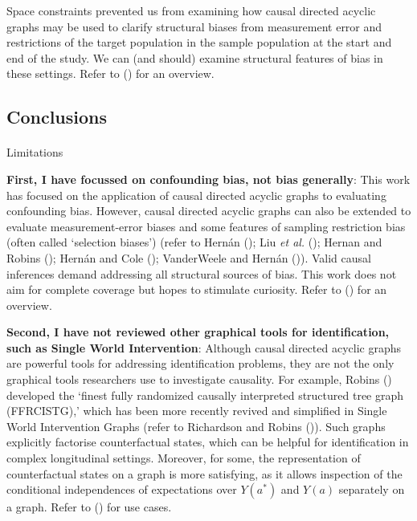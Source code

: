 \documentclass[
  single column]{article}
\makeatletter
\let\oldparagraph\paragraph
\renewcommand{\paragraph}{
    \@ifstar
      \xxxParagraphStar
      \xxxParagraphNoStar
  }
\newcommand{\xxxParagraphStar}[1]{\oldparagraph*{#1}\mbox{}}
\newcommand{\xxxParagraphNoStar}[1]{\oldparagraph{#1}\mbox{}}
\makeatother
\begin{document}
\begin{enumerate}
  Space constraints prevented us from examining how causal directed
  acyclic graphs may be used to clarify structural biases from
  measurement error and restrictions of the target population in the
  sample population at the start and end of the study. We can (and
  should) examine structural features of bias in these settings. Refer
  to () for an overview.
\end{enumerate}

\subsection{Conclusions}\label{id-sec-6}

\paragraph{Limitations}\label{limitations}

\textbf{First, I have focussed on confounding bias, not bias generally}:
This work has focused on the application of causal directed acyclic
graphs to evaluating confounding bias. However, causal directed acyclic
graphs can also be extended to evaluate measurement-error biases and
some features of sampling restriction bias (often called `selection
biases') (refer to Hernán
(); Liu \emph{et
al.} (); Hernan and Robins
(); Hernán and Cole
(); VanderWeele and Hernán
()). Valid causal
inferences demand addressing all structural sources of bias. This work
does not aim for complete coverage but hopes to stimulate curiosity.
Refer to () for an overview.

\textbf{Second, I have not reviewed other graphical tools for
identification, such as Single World Intervention}: Although causal
directed acyclic graphs are powerful tools for addressing identification
problems, they are not the only graphical tools researchers use to
investigate causality. For example, Robins
() developed the `finest fully randomized
causally interpreted structured tree graph (FFRCISTG),' which has been
more recently revived and simplified in Single World Intervention Graphs
(refer to Richardson and Robins
()). Such graphs
explicitly factorise counterfactual states, which can be helpful for
identification in complex longitudinal settings. Moreover, for some, the
representation of counterfactual states on a graph is more satisfying,
as it allows inspection of the conditional independences of expectations
over \(Y(a^*)\) and \(Y(a)\) separately on a graph. Refer to
() for use cases.
\end{document}
